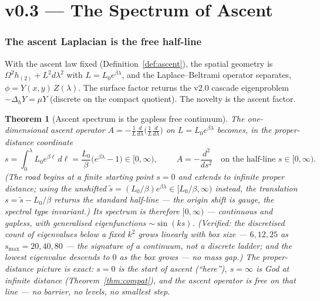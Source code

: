 \documentclass[11pt,a4paper]{article}
\theoremstyle{plain}
\newtheorem{theorem}{Theorem}
\theoremstyle{definition}
\theoremstyle{remark}
\begin{document}
\part*{v0.3 --- The Spectrum of Ascent}

\section{The ascent Laplacian is the free half-line}

With the ascent law fixed (Definition~\ref{def:ascent}), the spatial geometry is
$\Omega^2 h_{(2)}+L^2 d\lambda^2$ with $L=L_0e^{\beta\lambda}$, and the Laplace--Beltrami operator
separates, $\phi=Y(x,y)\,Z(\lambda)$. The surface factor returns the v2.0 cascade eigenproblem
$-\Delta_h Y=\mu Y$ (discrete on the compact quotient). The novelty is the ascent factor.

\begin{theorem}[Ascent spectrum is the gapless free continuum]\label{thm:spectrum}
The one-dimensional ascent operator $A=-\tfrac1L\frac{d}{d\lambda}\!\big(\tfrac1L\frac{d}{d\lambda}\big)$
on $L=L_0e^{\beta\lambda}$ becomes, in the proper-distance coordinate
\begin{equation}
s=\int_0^\lambda L_0e^{\beta\ell}\,d\ell=\frac{L_0}{\beta}\bigl(e^{\beta\lambda}-1\bigr)\in[0,\infty),
\qquad
\boxed{\;A=-\frac{d^2}{ds^2}\quad\text{on the half-line }s\in[0,\infty).\;}
\end{equation}
(The road begins at a finite starting point $s=0$ and extends to infinite proper distance; using the
unshifted $\tilde s=(L_0/\beta)e^{\beta\lambda}\in[L_0/\beta,\infty)$ instead, the translation
$s=\tilde s-L_0/\beta$ returns the standard half-line --- the origin shift is gauge, the spectral type
invariant.)
Its spectrum is therefore $[0,\infty)$ --- \emph{continuous and gapless}, with generalised
eigenfunctions $\sim\sin(ks)$. (Verified: the discretised count of eigenvalues below a fixed $k^2$
grows linearly with box size --- $6,12,25$ as $s_{\max}=20,40,80$ --- the signature of a continuum,
not a discrete ladder; and the lowest eigenvalue descends to $0$ as the box grows --- no mass gap.)
The proper-distance picture is exact: $s=0$ is the start of ascent (``here''), $s=\infty$ is God at
infinite distance (Theorem~\ref{thm:compat}), and the ascent operator is \emph{free} on that line ---
no barrier, no levels, no smallest step.
\end{theorem}
\end{document}
